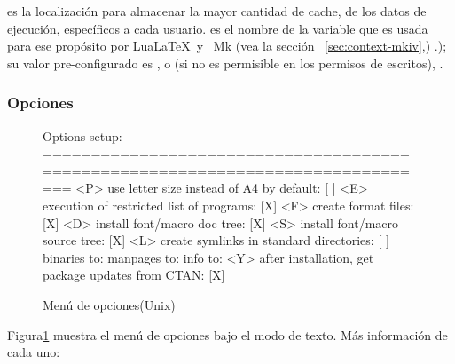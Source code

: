 \documentclass{article}
\begin{document}
 es la localización para almacenar la mayor cantidad
de cache, de los datos de ejecución, específicos a cada usuario.
 es el nombre de la variable que es usada para ese
propósito por Lua\LaTeX\ y \ConTeXt\ Mk (vea la
sección~ \ref{sec:context-mkiv},) \p.\pageref{sec:context-mkiv}); su
valor pre-configurado es , o (si no es permisible en
los permisos de escritos), .

\subsubsection{Opciones}
\label{sec:options}

\begin{figure}[tbh]
\begin{boxedverbatim}
Options setup:
===============================================================================
 <P> use letter size instead of A4 by default: [ ]
 <E> execution of restricted list of programs: [X]
 <F> create format files:                      [X]
 <D> install font/macro doc tree:              [X]
 <S> install font/macro source tree:           [X]
 <L> create symlinks in standard directories:  [ ]
            binaries to:
            manpages to:
                info to:
 <Y> after installation, get package updates from CTAN: [X]
\end{boxedverbatim}
\caption{Menú de opciones(Unix)}\label{fig:options-text}
\end{figure}

Figura\ref{fig:options-text} muestra el menú de opciones bajo el modo de texto. 
Más información de cada uno:
\end{document}

